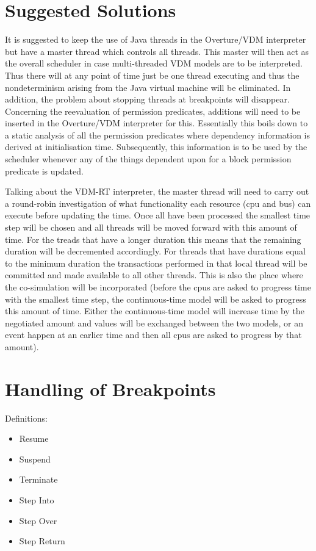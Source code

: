 \documentclass{overturerep}
\begin{document}
\section{Suggested Solutions}

It is suggested to keep the use of Java threads in the Overture/VDM
interpreter but have a master thread which controls all threads. This
master will then act as the overall scheduler in case multi-threaded
VDM models are to be interpreted. Thus there will at any point of time
just be one thread executing and thus the nondeterminism arising from
the Java virtual machine will be eliminated. In addition, the problem
about stopping threads at breakpoints will disappear. Concerning the
reevaluation of permission predicates, additions will need to be
inserted in the Overture/VDM interpreter for this. Essentially this
boils down to a static analysis of all the permission predicates where
dependency information is derived at initialisation time. Subsequently,
this information is to be used by the scheduler whenever any of the
things dependent upon for a block permission predicate is updated.

Talking about the VDM-RT interpreter, the master thread will need
to carry out a round-robin investigation of what functionality each
resource (cpu and bus) can execute before updating the time. Once
all have been processed the smallest time step will be
chosen and all threads will be moved forward with this amount of
time. For the treads that have a longer duration this means that the
remaining duration will be decremented accordingly. For threads that
have durations equal to the minimum duration the transactions
performed in that local thread will be committed and made available to
all other threads. This is also the place where the co-simulation
will be incorporated (before the cpus are asked to progress time with
the smallest time step, the continuous-time model will be asked to progress
this amount of time. Either the continuous-time model will increase time 
by the negotiated amount and values will be exchanged between the two
models, or an event happen at an earlier time and then all
cpus are asked to progress by that amount). 

\section{Handling of Breakpoints}


Definitions:

\begin{itemize}
	\item Resume
	\item Suspend
	\item Terminate
	\item Step Into
	\item Step Over
	\item Step Return
\end{itemize}
\end{document}
